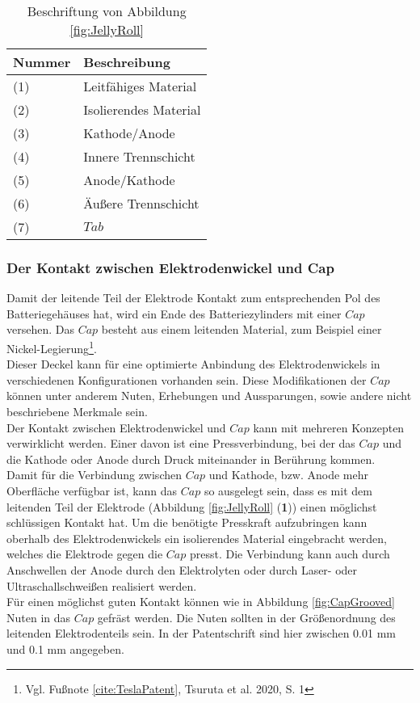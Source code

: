 \begin{table}[h!]
	\caption{Beschriftung von Abbildung \ref{fig:JellyRoll}}
	\label{tab:BeschriftungJellyRoll}
	\vspace{0.2cm}	
	\begin{tabularx}{\textwidth}{ |X|X|  }
		\toprule[1.5pt]
		\textbf{Nummer} & \textbf{Beschreibung} \\
		\hline\hline
		(1) & Leitfähiges Material \\
		\hline
		(2) & Isolierendes Material\\
		\hline
		(3) & Kathode/Anode\\
		\hline
		(4) & Innere Trennschicht\\
		\hline
		(5) & Anode/Kathode\\
		\hline
		(6) & Äußere Trennschicht\\
		\hline
		(7) & $Tab$\\
		\bottomrule[1.5pt]
	\end{tabularx}		
\end{table}

\subsubsection*{Der Kontakt zwischen Elektrodenwickel und Cap}\label{subsub:JellyrollCapContact}

Damit der leitende Teil der Elektrode Kontakt zum entsprechenden Pol des Batteriegehäuses hat, wird ein Ende des Batteriezylinders mit einer $Cap$ versehen. Das $Cap$ besteht aus einem leitenden Material, zum Beispiel einer Nickel-Legierung\footnote{Vgl. Fußnote \ref{cite:TeslaPatent}, Tsuruta et al. 2020, S. 1}.\\
Dieser Deckel kann für eine optimierte Anbindung des Elektrodenwickels in verschiedenen Konfigurationen vorhanden sein. Diese Modifikationen der $Cap$ können unter anderem Nuten, Erhebungen und Aussparungen, sowie andere nicht beschriebene Merkmale sein.\\
Der Kontakt zwischen Elektrodenwickel und $Cap$ kann mit mehreren Konzepten verwirklicht werden. Einer davon ist eine Pressverbindung, bei der das $Cap$ und die Kathode oder Anode durch Druck miteinander in Berührung kommen.\\
Damit für die Verbindung zwischen $Cap$ und Kathode, bzw. Anode mehr Oberfläche verfügbar ist, kann das $Cap$ so ausgelegt sein, dass es mit dem leitenden Teil der Elektrode (Abbildung \ref{fig:JellyRoll} (\textbf{1})) einen möglichst schlüssigen Kontakt hat. Um die benötigte Presskraft aufzubringen kann oberhalb des Elektrodenwickels ein isolierendes Material eingebracht werden, welches die Elektrode gegen die $Cap$ presst. Die Verbindung kann auch durch Anschwellen der Anode durch den Elektrolyten oder durch Laser- oder Ultraschallschweißen realisiert werden.\\
Für einen möglichst guten Kontakt können wie in Abbildung \ref{fig:CapGrooved} Nuten in das $Cap$ gefräst werden. Die Nuten sollten in der Größenordnung des leitenden Elektrodenteils sein. In der Patentschrift sind hier zwischen 0.01 mm und 0.1 mm angegeben.\\

